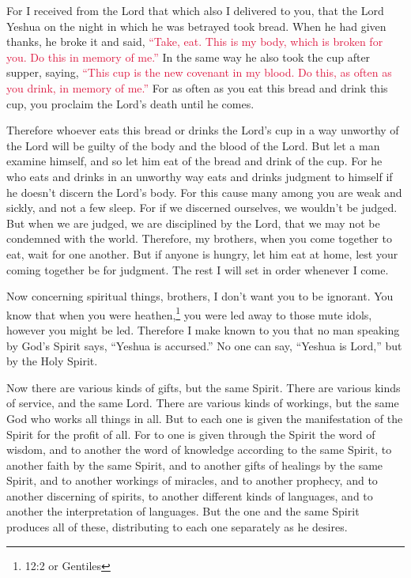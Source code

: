 \myverse{}For I received from the Lord that which also I delivered to
you, that the Lord Yeshua on the night in which he was betrayed took bread.
\myverse{}When he had given thanks, he broke it and said,
\textcolor{crimson}{“Take, eat. This is my body, which is broken for you. Do this in memory of me.”}
\myverse{}In the same way he also took the cup after supper, saying,
\textcolor{crimson}{“This cup is the new covenant in my blood. Do this, as often as you drink, in memory of me.”}
\myverse{}For as often as you eat this bread and drink this cup, you proclaim the Lord’s
death until he comes.

\myverse{}Therefore whoever eats this bread or drinks the Lord’s cup in
a way unworthy of the Lord will be guilty of the body and the blood of the Lord.
\myverse{}But let a man examine himself, and so let him eat of the bread and drink
of the cup.
\myverse{}For he who eats and drinks in an unworthy way eats and drinks judgment to
himself if he doesn’t discern the Lord’s body.
\myverse{}For this cause many among you are weak and sickly, and not a few sleep.
\myverse{}For if we discerned ourselves, we wouldn’t be judged.
\myverse{}But when we are judged, we are disciplined by the Lord, that we may not be
condemned with the world.
\myverse{}Therefore, my brothers, when you come together to eat, wait for one another.
\myverse{}But if anyone is hungry, let him eat at home, lest your coming together be
for judgment. The rest I will set in order whenever I come.


\mychapter{} \myverse*{}Now concerning spiritual things, brothers, I don’t want you to
be ignorant.
\myverse{}You know that when you were heathen,\footnote{12:2 or Gentiles} you were led away to those mute idols, however you might be led.
\myverse{}Therefore I make known to you that no man speaking by God’s Spirit says, “Yeshua
is accursed.” No one can say, “Yeshua is Lord,” but by the Holy Spirit.

\myverse{}Now there are various kinds of gifts, but the same Spirit.
\myverse{}There are various kinds of service, and the same Lord.
\myverse{}There are various kinds of workings, but the same God who works all things
in all.
\myverse{}But to each one is given the manifestation of the Spirit for the profit of
all.
\myverse{}For to one is given through the Spirit the word of wisdom, and to another the
word of knowledge according to the same Spirit,
\myverse{}to another faith by the same Spirit, and to another gifts of healings by the
same Spirit,
\myverse{}and to another workings of miracles, and to another prophecy, and to another
discerning of spirits, to another different kinds of languages, and to another the interpretation of languages.
\myverse{}But the one and the same Spirit produces all of these, distributing to each
one separately as he desires.

